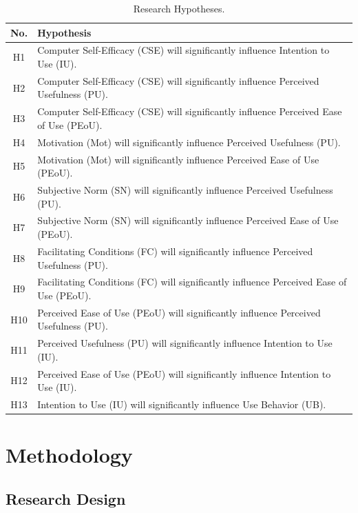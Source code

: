 \documentclass[english]{textolivre}
\begin{document}
\begin{table}[htbp]
\centering
\begin{threeparttable}
\caption{Research Hypotheses.}
\label{tab1}
\begin{tabular}{cp{13cm}}
\toprule
No. & Hypothesis \\
\midrule
H1  & Computer Self-Efficacy (CSE) will significantly influence Intention to Use (IU). \\
H2  & Computer Self-Efficacy (CSE) will significantly influence Perceived Usefulness (PU). \\
H3  & Computer Self-Efficacy (CSE) will significantly influence Perceived Ease of Use (PEoU). \\
H4  & Motivation (Mot) will significantly influence Perceived Usefulness (PU). \\
H5  & Motivation (Mot) will significantly influence Perceived Ease of Use (PEoU). \\
H6  & Subjective Norm (SN) will significantly influence Perceived Usefulness (PU). \\
H7  & Subjective Norm (SN) will significantly influence Perceived Ease of Use (PEoU). \\
H8  & Facilitating Conditions (FC) will significantly influence Perceived Usefulness (PU). \\
H9  & Facilitating Conditions (FC) will significantly influence Perceived Ease of Use (PEoU). \\
H10 & Perceived Ease of Use (PEoU) will significantly influence Perceived Usefulness (PU). \\
H11 & Perceived Usefulness (PU) will significantly influence Intention to Use (IU). \\
H12 & Perceived Ease of Use (PEoU) will significantly influence Intention to Use (IU). \\
H13 & Intention to Use (IU) will significantly influence Use Behavior (UB). \\
\bottomrule
\end{tabular}
\end{threeparttable}
\end{table}


\section{Methodology}\label{sec-formato}

\subsection{Research Design}
\end{document}
